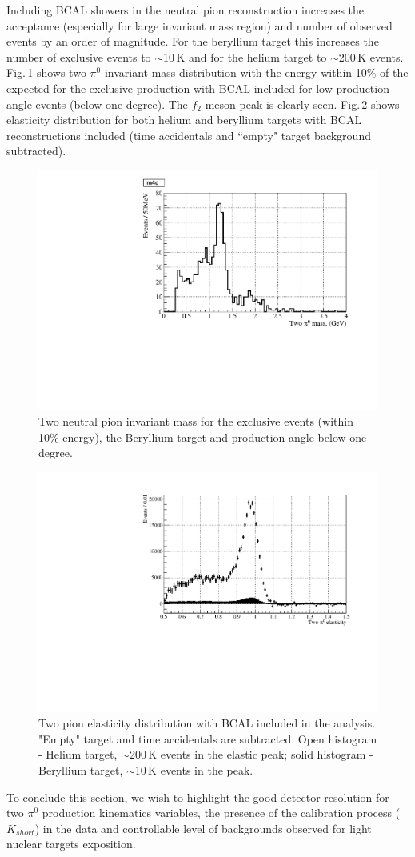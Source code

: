 Including BCAL showers in the neutral pion reconstruction increases the acceptance (especially for large invariant mass region) and number of observed events by an order of magnitude. For the beryllium target this increases the number of exclusive events to $\sim$10$\,$K and for the helium target to $\sim$200$\,$K events. Fig.$\,$\ref{fig:bemass} shows two $\pi^0$ invariant mass distribution with the energy within 10$\%$ of the expected for the exclusive production with BCAL included for low production angle events (below one degree). The $f_2$ meson peak is clearly seen. Fig.$\,$\ref{fig:beheelast} shows elasticity distribution for both helium and beryllium targets with BCAL reconstructions included (time accidentals and ``empty" target background subtracted).
\begin{figure}[!h]
\centering\includegraphics[width=4.75in]{figures/be_mass.pdf}
\caption{Two neutral pion invariant mass for the exclusive events (within 10\% energy), the Beryllium target and production angle below one degree.
\label{fig:bemass}}
\end{figure}
\begin{figure}[!h]
\centering\includegraphics[width=4.5in]{figures/hebe_elast.pdf}
\caption{Two pion elasticity distribution with BCAL included in the analysis. "Empty" target and time accidentals are subtracted. Open histogram - Helium target, $\sim$200$\,$K events in the elastic peak; solid histogram - Beryllium target, $\sim$10$\,$K events in the peak.
\label{fig:beheelast}}
\end{figure}


To conclude this section, we wish to highlight the good detector resolution for two $\pi^0$ production kinematics variables, the presence of the calibration process ($K_{short}$) in the data and controllable level of backgrounds observed for light nuclear targets exposition.
